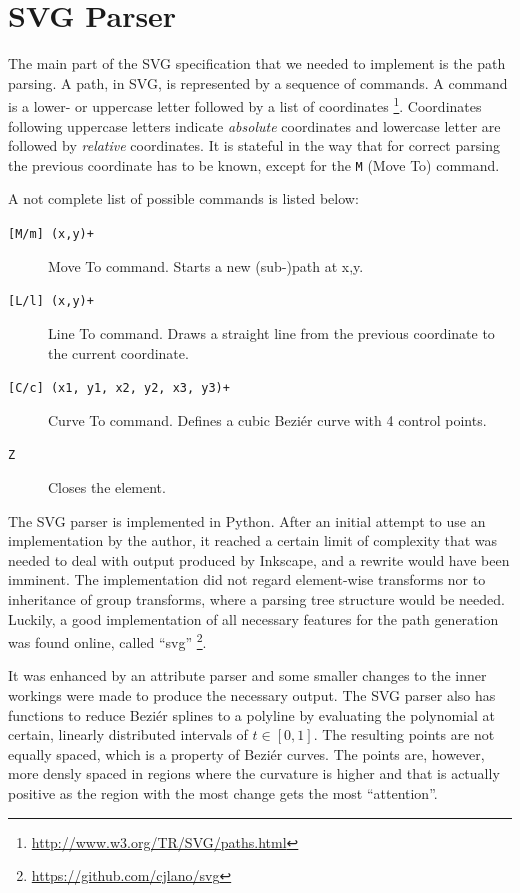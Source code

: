 \section{SVG Parser}

The main part of the SVG specification that we needed to implement is the path parsing. A path, in SVG, is represented by a sequence of commands. A command is a lower- or uppercase letter followed by a list of coordinates
\footnote{\url{http://www.w3.org/TR/SVG/paths.html}}. Coordinates following uppercase letters indicate \textit{absolute} coordinates and lowercase letter are followed by \textit{relative} coordinates. It is stateful in the way that for correct parsing the previous coordinate has to be known, except for the \texttt{M} (Move To) command.

A not complete list of possible commands is listed below:

\begin{description}
\item[\texttt{[M/m] (x,y)+}] Move To command. Starts a new (sub-)path at x,y.
\item[\texttt{[L/l] (x,y)+}] Line To command. Draws a straight line from the previous coordinate to the current coordinate.
\item[\texttt{[C/c] (x1, y1, x2, y2, x3, y3)+}] Curve To command. Defines a cubic Beziér curve with 4 control points.
\item[\texttt{Z}] Closes the element.
\end{description} 

The SVG parser is implemented in Python. After an initial attempt to use an implementation by the author, it reached a certain limit of complexity that was needed to deal with output produced by Inkscape, and a rewrite would have been imminent. The implementation did not regard element-wise transforms nor to inheritance of group transforms, where a parsing tree structure would be needed. Luckily, a good implementation of all necessary features for the path generation was found online, called \enquote{svg} \footnote{\url{https://github.com/cjlano/svg}}.

It was enhanced by an attribute parser and some smaller changes to the inner workings were made to produce the necessary output. The SVG parser also has functions to reduce Beziér splines to a polyline by evaluating the polynomial at certain, linearly distributed intervals of $t \in [0, 1]$. The resulting points are not equally spaced, which is a property of Beziér curves. The points are, however, more densly spaced in regions where the curvature is higher and that is actually positive as the region with the most change gets the most \enquote{attention}. 


